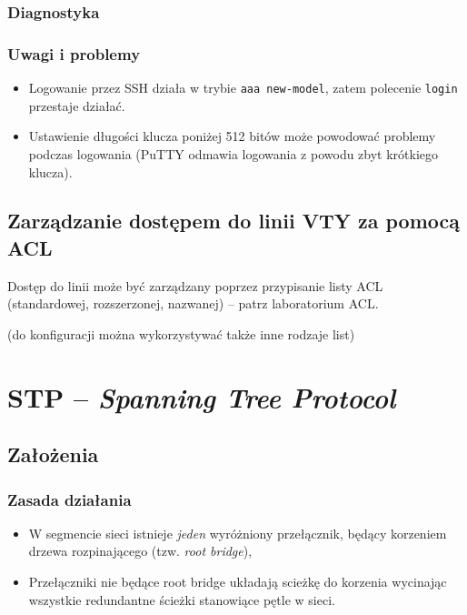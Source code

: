 \subsubsection{Diagnostyka}

\subsubsection{Uwagi i problemy}
\begin{itemize}
	\item Logowanie przez SSH działa w trybie \texttt{aaa new-model}, zatem polecenie \texttt{login} przestaje działać.
	\item Ustawienie długości klucza poniżej 512 bitów może powodować problemy podczas logowania (PuTTY odmawia logowania z powodu zbyt krótkiego klucza).
\end{itemize}

\subsection{Zarządzanie dostępem do linii VTY za pomocą ACL}
Dostęp do linii może być zarządzany poprzez przypisanie listy ACL (standardowej, rozszerzonej, nazwanej) -- patrz laboratorium ACL.


 (do konfiguracji można wykorzystywać także inne rodzaje list)

\section{STP -- \textit{Spanning Tree Protocol}}

\subsection{Założenia}
\subsubsection{Zasada działania}
\begin{itemize}
	\item W segmencie sieci istnieje \textit{jeden} wyróżniony przełącznik, będący korzeniem drzewa rozpinającego (tzw. \textit{root bridge}),
	\item Przełączniki nie będące root bridge układają scieżkę do korzenia wycinając wszystkie redundantne ścieżki stanowiące pętle w sieci.
\end{itemize}
